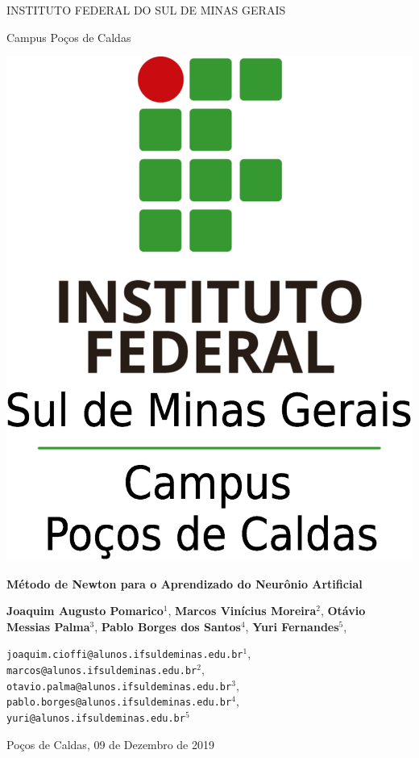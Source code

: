 \documentclass[12pt]{article}
\begin{document}
\justifying
\begin{center}
    \onehalfspacing
    
    \Large{INSTITUTO FEDERAL DO SUL DE MINAS GERAIS}
    
    \normalsize{Campus Poços de Caldas}
    
    \vspace{0.5cm}
    \includegraphics[scale=0.1]{img/pcs-logo.eps}
    
    \LARGE{\textbf{Método de Newton para o Aprendizado do Neurônio Artificial}}
    
    \large{\textbf{Joaquim Augusto Pomarico}$^{1}$, \textbf{Marcos Vinícius Moreira}$^{2}$, \textbf{Otávio Messias Palma}$^{3}$, \textbf{Pablo Borges dos Santos}$^{4}$, \textbf{Yuri Fernandes}$^{5}$,}
    
    \normalsize{\texttt{joaquim.cioffi@alunos.ifsuldeminas.edu.br$^{1}$}, \texttt{ marcos@alunos.ifsuldeminas.edu.br$^{2}$}, \texttt{ otavio.palma@alunos.ifsuldeminas.edu.br$^{3}$},\texttt{ pablo.borges@alunos.ifsuldeminas.edu.br$^{4}$},\texttt{ yuri@alunos.ifsuldeminas.edu.br$^{5}$}}
    
    Poços de Caldas, 09 de Dezembro de 2019
\end{center}
\end{document}

